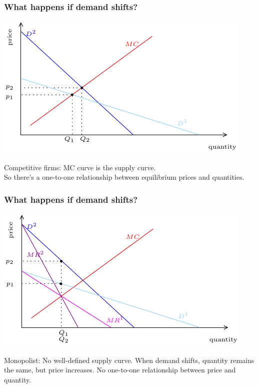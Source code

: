\documentclass[xcolor=pdftex,dvipsnames]{beamer}
\begin{document}
\begin{frame}
  \frametitle{What happens if demand shifts?}
  \begin{center}
    \includegraphics{pics/ShiftComp}
  \end{center}
  Competitive firms: MC curve is the supply curve.\\
  So there's a one-to-one relationship between equilibrium prices and quantities.
\end{frame}

\begin{frame}
  \frametitle{What happens if demand shifts?}
  \begin{center}
    \includegraphics{pics/ShiftMon} 
  \end{center}
  Monopolist: No well-defined supply curve.
  When demand shifts, quantity remains the same, but price
  increases. No one-to-one relationship between price and quantity.
\end{frame}
\end{document}
